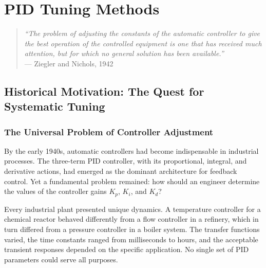 
\chapter{PID Tuning Methods}
\label{ch:pid_tuning}

\begin{quote}
\textit{``The problem of adjusting the constants of the automatic controller to give the best operation of the controlled equipment is one that has received much attention, but for which no general solution has been available.''}\\
\hfill --- Ziegler and Nichols, 1942
\end{quote}

\section{Historical Motivation: The Quest for Systematic Tuning}
\label{sec:pid_tuning_history}

\subsection{The Universal Problem of Controller Adjustment}

By the early 1940s, automatic controllers had become indispensable in industrial processes. The three-term PID controller, with its proportional, integral, and derivative actions, had emerged as the dominant architecture for feedback control. Yet a fundamental problem remained: how should an engineer determine the values of the controller gains $K_p$, $K_i$, and $K_d$?

Every industrial plant presented unique dynamics. A temperature controller for a chemical reactor behaved differently from a flow controller in a refinery, which in turn differed from a pressure controller in a boiler system. The transfer functions varied, the time constants ranged from milliseconds to hours, and the acceptable transient responses depended on the specific application. No single set of PID parameters could serve all purposes.


